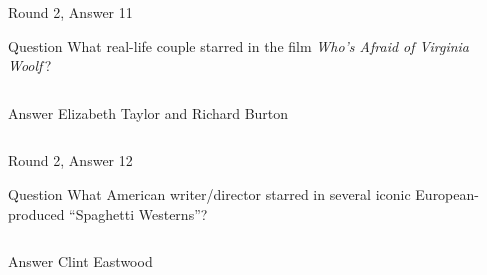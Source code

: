 \documentclass[11pt]{beamer}
\begin{document}
\begin{frame}[t]{Round 2, Answer 11}
\vspace{2em}
\begin{block}{Question}
What real-life couple starred in the film \emph{Who's Afraid of Virginia Woolf}\,?
\end{block}
\pause{}
\begin{columns}[T,totalwidth=\linewidth]
\begin{column}{0.35\linewidth}
\begin{block}{Answer}
Elizabeth Taylor and Richard Burton
\end{block}
\end{column}
\begin{column}{0.6\linewidth}
\begin{center}
\texttt{[image: \{Images/woolf]}.jpg}
\end{center}
\end{column}
\end{columns}
\end{frame}
    

\begin{frame}[t]{Round 2, Answer 12}
\vspace{2em}
\begin{block}{Question}
What American writer/director starred in several iconic European-produced ``Spaghetti Westerns''?
\end{block}
\pause{}
\begin{columns}[T,totalwidth=\linewidth]
\begin{column}{0.35\linewidth}
\begin{block}{Answer}
Clint Eastwood
\end{block}
\end{column}
\begin{column}{0.6\linewidth}
\begin{center}
\texttt{[image: \{Images/eastwood]}.jpg}
\end{center}
\end{column}
\end{columns}
\end{frame}
    
\end{document}
